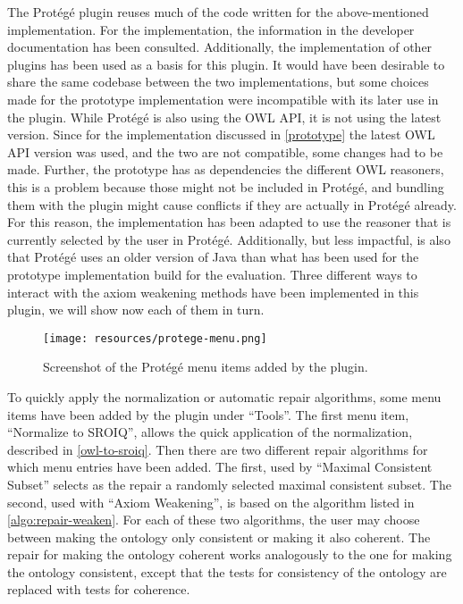 
The Protégé plugin reuses much of the code written for the above-mentioned implementation. For the implementation, the information in the developer documentation \cite{protege5devdocs} has been consulted. Additionally, the implementation of other plugins \cite{ontodebug,protegepluginexamples} has been used as a basis for this plugin. It would have been desirable to share the same codebase between the two implementations, but some choices made for the prototype implementation were incompatible with its later use in the plugin. While Protégé is also using the OWL API, it is not using the latest version. Since for the implementation discussed in \cref{prototype} the latest OWL API version was used, and the two are not compatible, some changes had to be made. Further, the prototype has as dependencies the different OWL reasoners, this is a problem because those might not be included in Protégé, and bundling them with the plugin might cause conflicts if they are actually in Protégé already. For this reason, the implementation has been adapted to use the reasoner that is currently selected by the user in Protégé. Additionally, but less impactful, is also that Protégé uses an older version of Java than what has been used for the prototype implementation build for the evaluation. Three different ways to interact with the axiom weakening methods have been implemented in this plugin, we will show now each of them in turn.

\begin{figure}[ht]
  \centering
  \texttt{[image: resources/protege-menu.png]}
  \caption{Screenshot of the Protégé menu items added by the plugin.}
  \label{fig:protege-menu}
\end{figure}

To quickly apply the normalization or automatic repair algorithms, some menu items have been added by the plugin under ``Tools''. The first menu item, ``Normalize to SROIQ'', allows the quick application of the normalization, described in \cref{owl-to-sroiq}. Then there are two different repair algorithms for which menu entries have been added. The first, used by ``Maximal Consistent Subset'' selects as the repair a randomly selected maximal consistent subset. The second, used with ``Axiom Weakening'', is based on the algorithm listed in \cref{algo:repair-weaken}. For each of these two algorithms, the user may choose between making the ontology only consistent or making it also coherent. The repair for making the ontology coherent works analogously to the one for making the ontology consistent, except that the tests for consistency of the ontology are replaced with tests for coherence.

